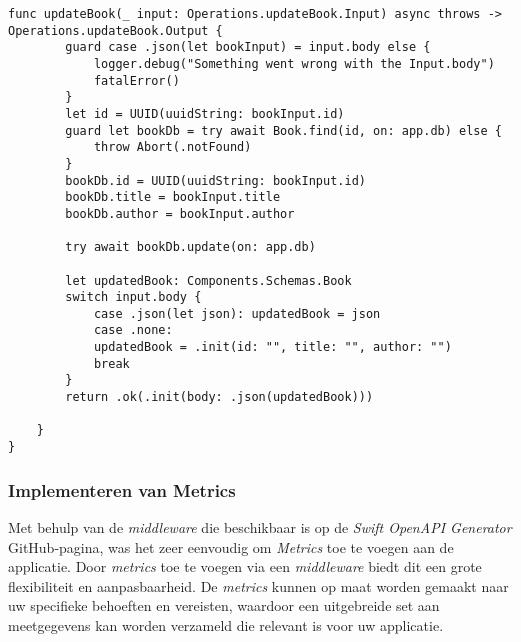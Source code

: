 \begin{lstlisting}[caption=handler file]
    func updateBook(_ input: Operations.updateBook.Input) async throws -> Operations.updateBook.Output {
        guard case .json(let bookInput) = input.body else {
            logger.debug("Something went wrong with the Input.body")
            fatalError()
        }
        let id = UUID(uuidString: bookInput.id)
        guard let bookDb = try await Book.find(id, on: app.db) else {
            throw Abort(.notFound)
        }
        bookDb.id = UUID(uuidString: bookInput.id)
        bookDb.title = bookInput.title
        bookDb.author = bookInput.author
        
        try await bookDb.update(on: app.db)
        
        let updatedBook: Components.Schemas.Book
        switch input.body {
            case .json(let json): updatedBook = json
            case .none:
            updatedBook = .init(id: "", title: "", author: "")
            break
        }
        return .ok(.init(body: .json(updatedBook)))
    
    }    
}

\end{lstlisting}

\subsubsection{Implementeren van Metrics}
Met behulp van de \textit{middleware} die beschikbaar is op de \textit{Swift OpenAPI Generator} GitHub-pagina, was het zeer eenvoudig om \textit{Metrics} toe te voegen aan de applicatie.  Door \textit{metrics} toe te voegen via een \textit{middleware} biedt dit een grote flexibiliteit en aanpasbaarheid. De \textit{metrics} kunnen op maat worden gemaakt naar uw specifieke behoeften en vereisten, waardoor een uitgebreide set aan meetgegevens kan worden verzameld die relevant is voor uw applicatie.

